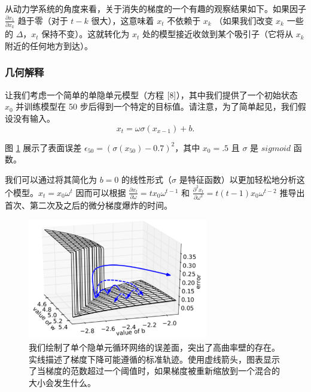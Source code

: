 从动力学系统的角度来看，关于消失的梯度的一个有趣的观察结果如下。如果因子 \(\frac{\partial x_1}{\partial x_k}\) 趋于零（对于 \(t-k\) 很大），这意味着 \(x_t\) 不依赖于 \(x_k\) （如果我们改变 \(x_k\) 一些的 \(\Delta\)，\(x_t\) 保持不变）。这就转化为 \(x_t\) 处的模型接近收敛到某个吸引子（它将从 \(x_k\) 附近的任何地方到达）。

\subsubsection{几何解释}\label{23-ux51e0ux4f55ux89e3ux91ca}

让我们考虑一个简单的单隐单元模型（方程 \(\eqref{8}\)），其中我们提供了一个初始状态 \(x_0\) 并训练模型在 50 步后得到一个特定的目标值。请注意，为了简单起见，我们假设没有输入。
\begin{equation}\label{8}
  x_t = \omega\sigma(x_{x-1})+b.
\end{equation}

图 \ref{fig:gradient} 展示了表面误差 \(\epsilon_{50} = (\sigma(x_{50})-0.7)^2\)，其中 \(x_0=.5\) 且 \(\sigma\) 是 \(sigmoid\) 函数。

我们可以通过将其简化为 \(b=0\) 的线性形式（\(\sigma\) 是特征函数）以更加轻松地分析这个模型。\(x_t = x_0 \omega^t\) 因而可以根据 \(\frac{\partial x_t}{\partial \omega} = tx_0\omega^{t-1}\) 和 \(\frac{\partial^2 x_t}{\partial \omega^2}=t(t-1)x_0\omega^{t-2}\) 推导出首次、第二次及之后的微分梯度爆炸的时间。

\begin{figure}[htbp]
  \centering
  \includegraphics[width=0.7\textwidth]{figures/IMG_AF85DFCD0BC3-1.jpeg}
  \caption{我们绘制了单个隐单元循环网络的误差面，突出了高曲率壁的存在。实线描述了梯度下降可能遵循的标准轨迹。使用虚线箭头，图表显示了当梯度的范数超过一个阈值时，如果梯度被重新缩放到一个混合的大小会发生什么。}
  \label{fig:gradient}
\end{figure}

